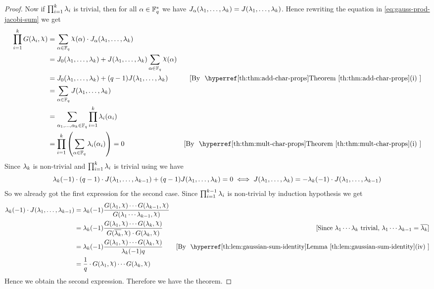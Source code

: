 \begin{proof}
  Now if $\prod_{i=1}^k\lambda_i$ is trivial, then for all $\alpha\in\mathbb{F}_q^*$ we have $J_{\alpha}(\lambda_1,\dots,\lambda_k)=J(\lambda_1,\dots, \lambda_k)$. Hence rewriting the equation in \eqref{eq:gauss-prod-jacobi-sum} we get \begin{align*}
    \prod_{i=1}^k G(\lm_i,\chi)& =\sum_{\alpha\in\bbF_q}\chi(\alpha)\cdot J_{\alpha}(\lm_1,\dots,\lm_k)\\ 
    & = J_0(\lm_1,\dots,\lm_k)+J(\lm_1,\dots,\lm_k)\sum_{\alpha\in\bbF_q}\chi(\alpha)\\ 
    & = J_0(\lm_1,\dots,\lm_k)+(q-1)J(\lm_1,\dots,\lm_k) \byt[(i)]{add-char-props}\\ 
    & = \sum_{\alpha\in\bbF_q}J(\lm_1,\dots,\lm_k)\\ 
    & = \sum_{\alpha_1,\dots,\alpha_k\in\bbF_q}\prod_{i=1}^k\lm_i(\alpha_i)\\ 
    & = \prod_{i=1}^k \lt(\sum_{\alpha\in\bbF_q}\lm_i(\alpha_i)\rt)=0\byt[(i)]{mult-char-props}
  \end{align*} Since $\lambda_k$ is non-trivial and $\prod_{i=1}^k\lambda_i$ is trivial using   we have  $$\lambda_k(-1)\cdot (q-1)\cdot J(\lambda_1,\dots,\lambda_{k-1})+(q-1)J(\lambda_1,\dots, \lambda_k)=0\iff J(\lambda_1,\dots, \lambda_k)=-\lambda_k(-1)\cdot J(\lambda_1,\dots,\lambda_{k-1})$$So we already got the first expression for the second case. Since $\prod_{i=1}^{k-1}\lambda_i$ is non-trivial by induction hypothesis we get \begin{align*}
    \lm_k(-1)\cdot J(\lm_1,\dots,\lm_{k-1})& = \lm_k(-1)\frac{G(\lm_1,\chi)\cdots G(\lm_{k-1},\chi)}{G(\lm_1\cdots\lm_{k-1},\chi)}\\ 
    & = \lm_k(-1)\frac{G(\lm_1,\chi)\cdots G(\lm_{k},\chi)}{G(\ov{\lm_k},\chi)\cdot G(\lm_k,\chi)}& [\text{Since }\lm_1\cdots\lm_k\text{ trivial, } \lm_1\cdots\lm_{k-1}=\ov{\lm_k}]\\ 
    & = \lm_k(-1)\frac{G(\lm_1,\chi)\cdots G(\lm_{k},\chi)}{\lm_k(-1)q}\byl[(iv)]{gaussian-sum-identity}\\ 
    & = \frac1q\cdot G(\lm_1,\chi)\cdots G(\lm_{k},\chi)
  \end{align*}
  Hence we obtain the second expression. Therefore we have the theorem. 
\end{proof}

